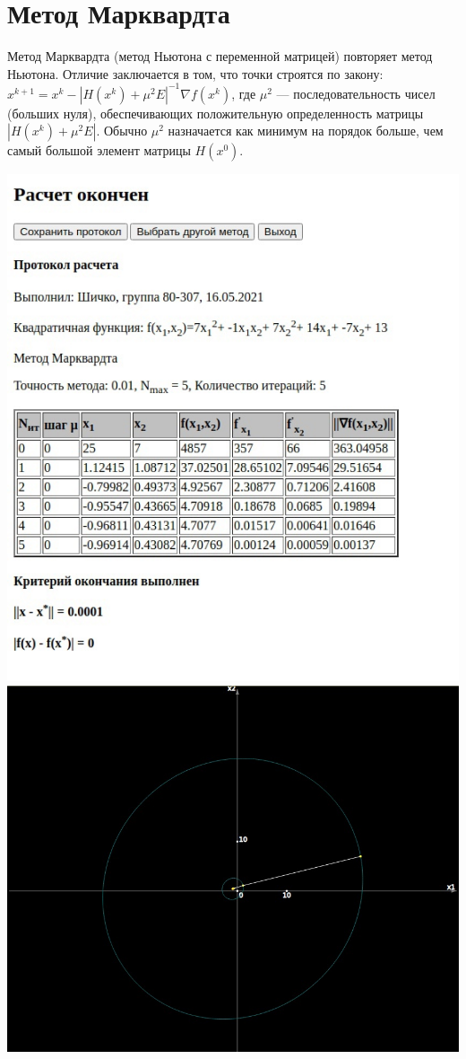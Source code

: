 \section{Метод Марквардта}

Метод Марквардта (метод Ньютона с переменной матрицей) повторяет метод Ньютона. Отличие заключается в том, что точки строятся по закону:
$ x^{k+1} = x^{k} - |H(x^{k}) + \mu^{2}E|^{-1} \nabla f(x^{k})$, где $\mu^{2}$ --- последовательность чисел (больших нуля), обеспечивающих положительную определенность матрицы $|H(x^{k}) + \mu^{2}E|$. Обычно $\mu^{2}$ назначается как минимум на порядок больше, чем самый большой элемент матрицы $H(x^{0})$.

\includegraphics[width=\linewidth]{images/5_prot.jpg}\\
\includegraphics[width=\linewidth]{images/5_image.jpg}\\

